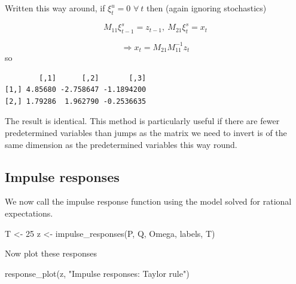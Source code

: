 \documentclass[
  letterpaper,
]{book}
\newenvironment{Shaded}{\begin{snugshade}}{\end{snugshade}}
\newcommand{\CommentTok}[1]{\textcolor[rgb]{0.37,0.37,0.37}{#1}}
\newcommand{\DecValTok}[1]{\textcolor[rgb]{0.68,0.00,0.00}{#1}}
\newcommand{\FunctionTok}[1]{\textcolor[rgb]{0.28,0.35,0.67}{#1}}
\newcommand{\NormalTok}[1]{\textcolor[rgb]{0.00,0.23,0.31}{#1}}
\newcommand{\OtherTok}[1]{\textcolor[rgb]{0.00,0.23,0.31}{#1}}
\newcommand{\SpecialCharTok}[1]{\textcolor[rgb]{0.37,0.37,0.37}{#1}}
\newcommand{\StringTok}[1]{\textcolor[rgb]{0.13,0.47,0.30}{#1}}
\begin{document}
Written this way around, if \(\xi_t^{u}=0\) \(\forall\ t\) then (again
ignoring stochastics)

\[
  M_{11} \xi_{t-1}^s = z_{t-1}, \ M_{21}\xi_t^s = x_t 
\]

\[
   \Rightarrow x_t = M_{21} M_{11}^{-1} z_t
\] so

\begin{Shaded}
\end{Shaded}

\begin{verbatim}
        [,1]      [,2]       [,3]
[1,] 4.85680 -2.758647 -1.1894200
[2,] 1.79286  1.962790 -0.2536635
\end{verbatim}

The result is identical. This method is particularly useful if there are
fewer predetermined variables than jumps as the matrix we need to invert
is of the same dimension as the predetermined variables this way round.

\hypertarget{impulse-responses}{%
\subsection{Impulse responses}\label{impulse-responses}}

We now call the impulse response function using the model solved for
rational expectations.

\begin{Shaded}
\begin{Highlighting}[]
\NormalTok{T }\OtherTok{\textless{}{-}} \DecValTok{25}
\NormalTok{z }\OtherTok{\textless{}{-}} \FunctionTok{impulse\_responses}\NormalTok{(P, Q, Omega, labels, T)}
\end{Highlighting}
\end{Shaded}

Now plot these responses

\begin{Shaded}
\begin{Highlighting}[]
\FunctionTok{response\_plot}\NormalTok{(z, }\StringTok{"Impulse responses: Taylor rule"}\NormalTok{)}
\end{Highlighting}
\end{Shaded}
\end{document}
